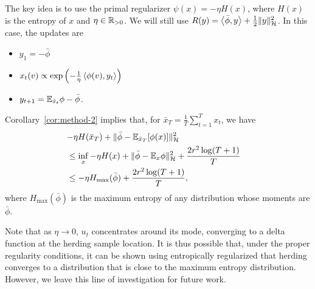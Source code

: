 \documentclass[paper.tex]{subfiles}
\begin{document}
The key idea is to use the primal regularizer $\psi(x) = -\eta H(x)$, where 
$H(x)$ is the entropy of $x$ and $\eta \in \mathbb{R}_{>0}$. We will still use 
$R(y) = \left\langle \bar{\phi}, y \right\rangle + \frac{1}{2} \|y\|_{\mathcal{H}}^2$.
In this case, the \dual updates are
\begin{itemize}
\item $y_1 = -\bar{\phi}$
\item $x_t(v) \propto \exp\left(-\frac{1}{\eta}\left\langle \phi(v), y_t \right\rangle\right)$
\item $y_{t+1} = \mathbb{E}_{\bar{x}_t}\phi - \bar\phi$.
\end{itemize}
Corollary~\ref{cor:method-2} implies that, for 
$\bar{x}_T = \frac{1}{T} \sum_{t=1}^T x_t$, we have
\begin{align*}
\lefteqn{-\eta H(\bar{x}_T) + \|\bar{\phi}-\bE_{\bar{x}_T}[\phi(x)]\|_{\sH}^2} \\
 &\leq \inf_{x} -\eta H(x) + \|\bar{\phi}-\bE_{x}\phi\|_{\sH}^2 + \frac{2r^2\log(T+1)}{T} \\
 &\leq -\eta H_{\max}(\bar{\phi}) + \frac{2r^2\log(T+1)}{T},
\end{align*}
where $H_{\max}(\bar{\phi})$ is the maximum entropy of any distribution whose 
moments are $\bar{\phi}$.

Note that as $\eta \to 0$, $u_{t}$ concentrates around its mode, converging to a delta function at the herding sample location. It is thus possible that, under the proper regularity conditions, it can be shown using entropically regularized \bmd that herding converges to a distribution that is close to the maximum entropy distribution. However, we leave this line of investigation for future work. 
\end{document}
